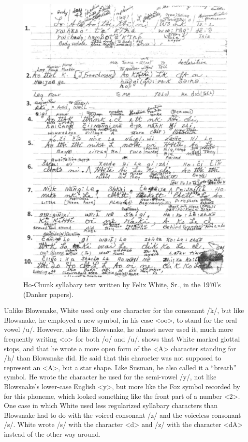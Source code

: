 \documentclass[output=paper]{LSP/langsci}
\begin{document}
\begin{figure}
\includegraphics[width=1\textwidth]{figures/DankerWhiteText}
\caption{Ho-Chunk syllabary text written by Felix White, Sr., in the 1970's (Danker papers).}
\label{whitetext}
\end{figure}

Unlike Blowsnake, White used only one character for the consonant /k/, but like Blowsnake, he employed a new symbol, in his case <oo>, to stand for the oral vowel /u/. However, also like Blowsnake, he almost never used it, much more frequently writing <o> for both /o/ and /u/.  shows that White marked glottal stops, and that he wrote a more open form of the <A> character standing for /h/ than Blowsnake did. He said that this character was not supposed to represent an <A>, but a star shape. Like Susman, he also called it a ``breath'' symbol. He wrote the character he used for the semi-vowel /y/, not like Blowsnake's lower-case English <y>, but more like the Fox symbol recorded by \citet{Jones1906} for this phoneme, which looked something like the front part of a number <2>. One case in which White used less regularized syllabary characters than Blowsnake had to do with the voiced consonant /z/ and the voiceless consonant /s/. White wrote /s/ with the character <d> and /z/ with the character <dA> instead of the other way around. 
\end{document}
